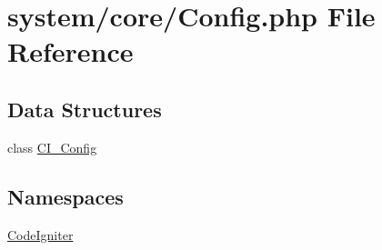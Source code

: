 \hypertarget{system_2core_2config_8php}{\section{system/core/\-Config.php File Reference}
\label{system_2core_2config_8php}
}
\subsection*{Data Structures}
\begin{DoxyCompactItemize}
\item 
class \hyperlink{class_c_i___config}{C\-I\-\_\-\-Config}
\end{DoxyCompactItemize}
\subsection*{Namespaces}
\begin{DoxyCompactItemize}
\item 
\hyperlink{namespace_code_igniter}{Code\-Igniter}
\end{DoxyCompactItemize}
